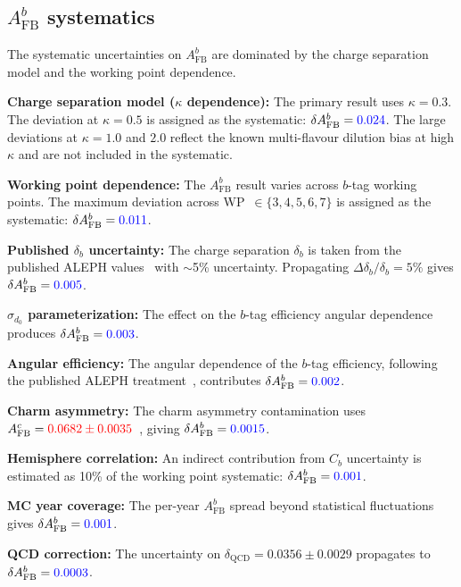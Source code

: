 \documentclass[11pt,a4paper]{article}
\newcommand{\measured}[1]{\textcolor{blue}{#1}}
\newcommand{\external}[1]{\textcolor{red}{#1}}
\begin{document}
\subsection{$A_\mathrm{FB}^b$ systematics}
\label{sec:syst-afb}

The systematic uncertainties on $A_\mathrm{FB}^b$ are dominated by
the charge separation model and the working point dependence.

\textbf{Charge separation model ($\kappa$ dependence):}
The primary result uses $\kappa = 0.3$.  The deviation at $\kappa = 0.5$
is assigned as the systematic: $\delta A_\mathrm{FB}^b = \measured{0.024}$.
The large deviations at $\kappa = 1.0$ and $2.0$ reflect the known
multi-flavour dilution bias at high $\kappa$ and are not included in the
systematic.

\textbf{Working point dependence:}
The $A_\mathrm{FB}^b$ result varies across $b$-tag working points.  The
maximum deviation across WP~$\in \{3, 4, 5, 6, 7\}$ is assigned as the
systematic: $\delta A_\mathrm{FB}^b = \measured{0.011}$.

\textbf{Published $\delta_b$ uncertainty:}
The charge separation $\delta_b$ is taken from the published ALEPH
values~\cite{LEP:EWWG:2005} with $\sim$5\% uncertainty.  Propagating
$\Delta\delta_b / \delta_b = 5\%$ gives
$\delta A_\mathrm{FB}^b = \measured{0.005}$.

\textbf{$\sigma_{d_0}$ parameterization:}
The effect on the $b$-tag efficiency angular dependence produces
$\delta A_\mathrm{FB}^b = \measured{0.003}$.

\textbf{Angular efficiency:}
The angular dependence of the $b$-tag efficiency, following the published
ALEPH treatment~\cite{LEP:EWWG:2005}, contributes
$\delta A_\mathrm{FB}^b = \measured{0.002}$.

\textbf{Charm asymmetry:}
The charm asymmetry contamination uses
$A_\mathrm{FB}^c = \external{0.0682 \pm 0.0035}$~\cite{LEP:EWWG:2005},
giving $\delta A_\mathrm{FB}^b = \measured{0.0015}$.

\textbf{Hemisphere correlation:}
An indirect contribution from $C_b$ uncertainty is estimated as 10\% of
the working point systematic:
$\delta A_\mathrm{FB}^b = \measured{0.001}$.

\textbf{MC year coverage:}
The per-year $A_\mathrm{FB}^b$ spread beyond statistical fluctuations
gives $\delta A_\mathrm{FB}^b = \measured{0.001}$.

\textbf{QCD correction:}
The uncertainty on $\delta_\mathrm{QCD} = 0.0356 \pm 0.0029$ propagates
to $\delta A_\mathrm{FB}^b = \measured{0.0003}$.
\end{document}
